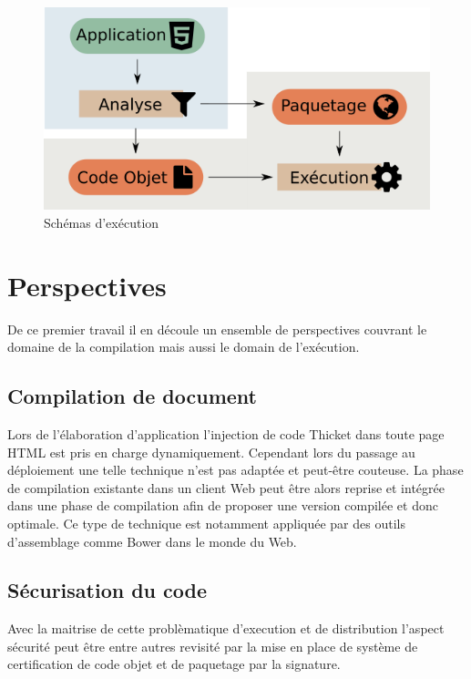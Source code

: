 \documentclass[twoside,a4paper]{article}
\begin{document}
\begin{figure}[h]
\centering
\includegraphics[scale=0.45]{execute} 
\caption{Schémas d'exécution}
\label{execute}
\end{figure}

\section{Perspectives}

De  ce premier  travail  il  en découle  un  ensemble de  perspectives
couvrant  le  domaine  de  la  compilation mais  aussi  le  domain  de
l'exécution.

\subsection{Compilation de document} 

Lors de  l'élaboration d'application l'injection de  code Thicket dans
toute page  HTML est pris  en charge dynamiquement. Cependant  lors du
passage  au  déploiement une  telle  technique  n'est pas  adaptée  et
peut-être couteuse. La  phase de compilation existante  dans un client
Web peut être alors reprise et  intégrée dans une phase de compilation
afin de  proposer une version  compilée et  donc optimale. Ce  type de
technique est  notamment appliquée  par des outils  d'assemblage comme
Bower \cite{bower} dans le monde du Web.

\subsection{Sécurisation du code}

Avec la maitrise de cette problèmatique d'execution et de distribution
l'aspect sécurité peut être entre autres revisité par la mise en place
de  système de  certification de  code objet  et de  paquetage par  la
signature.   
\end{document}
